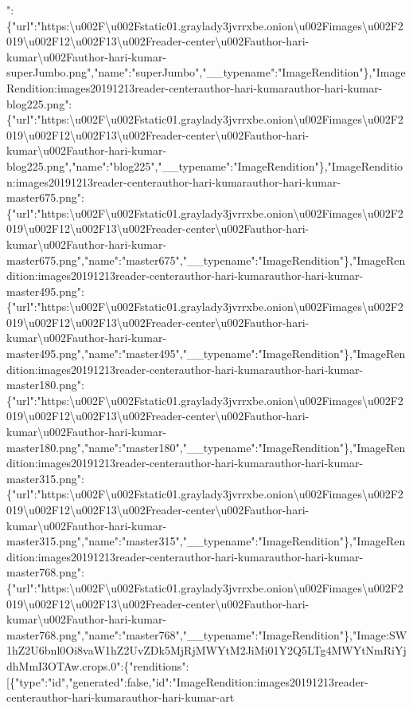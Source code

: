 ":\{"url":"https:\textbackslash{}u002F\textbackslash{}u002Fstatic01.graylady3jvrrxbe.onion\textbackslash{}u002Fimages\textbackslash{}u002F2019\textbackslash{}u002F12\textbackslash{}u002F13\textbackslash{}u002Freader-center\textbackslash{}u002Fauthor-hari-kumar\textbackslash{}u002Fauthor-hari-kumar-superJumbo.png","name":"superJumbo","\_\_typename":"ImageRendition"\},"ImageRendition:images20191213reader-centerauthor-hari-kumarauthor-hari-kumar-blog225.png":\{"url":"https:\textbackslash{}u002F\textbackslash{}u002Fstatic01.graylady3jvrrxbe.onion\textbackslash{}u002Fimages\textbackslash{}u002F2019\textbackslash{}u002F12\textbackslash{}u002F13\textbackslash{}u002Freader-center\textbackslash{}u002Fauthor-hari-kumar\textbackslash{}u002Fauthor-hari-kumar-blog225.png","name":"blog225","\_\_typename":"ImageRendition"\},"ImageRendition:images20191213reader-centerauthor-hari-kumarauthor-hari-kumar-master675.png":\{"url":"https:\textbackslash{}u002F\textbackslash{}u002Fstatic01.graylady3jvrrxbe.onion\textbackslash{}u002Fimages\textbackslash{}u002F2019\textbackslash{}u002F12\textbackslash{}u002F13\textbackslash{}u002Freader-center\textbackslash{}u002Fauthor-hari-kumar\textbackslash{}u002Fauthor-hari-kumar-master675.png","name":"master675","\_\_typename":"ImageRendition"\},"ImageRendition:images20191213reader-centerauthor-hari-kumarauthor-hari-kumar-master495.png":\{"url":"https:\textbackslash{}u002F\textbackslash{}u002Fstatic01.graylady3jvrrxbe.onion\textbackslash{}u002Fimages\textbackslash{}u002F2019\textbackslash{}u002F12\textbackslash{}u002F13\textbackslash{}u002Freader-center\textbackslash{}u002Fauthor-hari-kumar\textbackslash{}u002Fauthor-hari-kumar-master495.png","name":"master495","\_\_typename":"ImageRendition"\},"ImageRendition:images20191213reader-centerauthor-hari-kumarauthor-hari-kumar-master180.png":\{"url":"https:\textbackslash{}u002F\textbackslash{}u002Fstatic01.graylady3jvrrxbe.onion\textbackslash{}u002Fimages\textbackslash{}u002F2019\textbackslash{}u002F12\textbackslash{}u002F13\textbackslash{}u002Freader-center\textbackslash{}u002Fauthor-hari-kumar\textbackslash{}u002Fauthor-hari-kumar-master180.png","name":"master180","\_\_typename":"ImageRendition"\},"ImageRendition:images20191213reader-centerauthor-hari-kumarauthor-hari-kumar-master315.png":\{"url":"https:\textbackslash{}u002F\textbackslash{}u002Fstatic01.graylady3jvrrxbe.onion\textbackslash{}u002Fimages\textbackslash{}u002F2019\textbackslash{}u002F12\textbackslash{}u002F13\textbackslash{}u002Freader-center\textbackslash{}u002Fauthor-hari-kumar\textbackslash{}u002Fauthor-hari-kumar-master315.png","name":"master315","\_\_typename":"ImageRendition"\},"ImageRendition:images20191213reader-centerauthor-hari-kumarauthor-hari-kumar-master768.png":\{"url":"https:\textbackslash{}u002F\textbackslash{}u002Fstatic01.graylady3jvrrxbe.onion\textbackslash{}u002Fimages\textbackslash{}u002F2019\textbackslash{}u002F12\textbackslash{}u002F13\textbackslash{}u002Freader-center\textbackslash{}u002Fauthor-hari-kumar\textbackslash{}u002Fauthor-hari-kumar-master768.png","name":"master768","\_\_typename":"ImageRendition"\},"Image:SW1hZ2U6bnl0Oi8vaW1hZ2UvZDk5MjRjMWYtM2JiMi01Y2Q5LTg4MWYtNmRiYjdhMmI3OTAw.crops.0":\{"renditions":{[}\{"type":"id","generated":false,"id":"ImageRendition:images20191213reader-centerauthor-hari-kumarauthor-hari-kumar-art